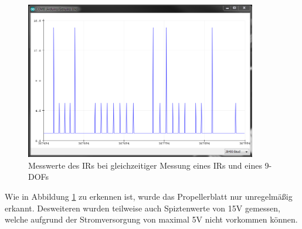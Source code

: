 \begin{figure}[H]
	\centering
	\includegraphics[width=0.9\textwidth]{images/chapter/03/interrupts_are_shit.png}
	\caption{Messwerte des \ac{IR}s bei gleichzeitiger Messung eines \ac{IR}s und eines \ac{9-DOF}s}
	\label{fig:interrupts_are_shit}
\end{figure}
Wie in Abbildung \ref{fig:interrupts_are_shit} zu erkennen ist, wurde das Propellerblatt nur unregelmäßig erkannt.
Desweiteren wurden teilweise auch Spiztenwerte von 15V gemessen, welche aufgrund der Stromversorgung von maximal 5V nicht vorkommen können.

